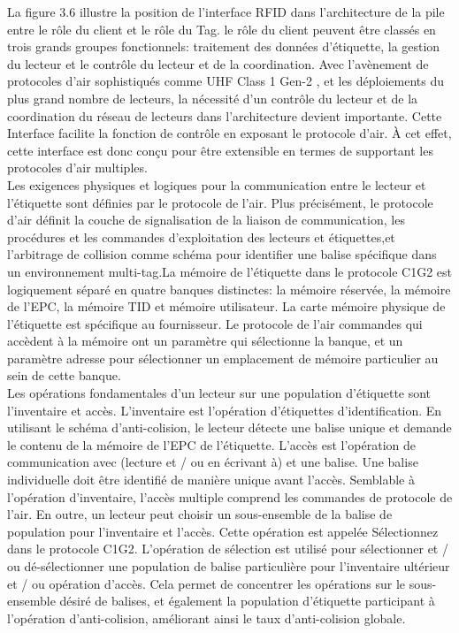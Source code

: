 \documentclass[11pt, a4paper, twoside]{book}
\begin{document}
La figure 3.6 illustre la position de l'interface RFID dans l'architecture de la pile entre le  rôle  du client  et le rôle du Tag. le rôle du client peuvent être classés en trois grands groupes fonctionnels: traitement des données d'étiquette, la gestion du lecteur  et le contrôle du lecteur et de la coordination. Avec l'avènement de protocoles d'air sophistiqués comme UHF Class 1 Gen-2 \cite{air}, et les déploiements du plus grand nombre de lecteurs, la nécessité d'un contrôle du lecteur et de la coordination  du réseau de lecteurs dans l'architecture devient importante. Cette Interface  facilite la fonction de contrôle en exposant le protocole d'air. À cet effet, cette interface est donc conçu pour être extensible en termes de supportant les protocoles d'air multiples.\\

Les exigences physiques et logiques pour la communication entre le lecteur et l'étiquette  sont définies par le protocole de l'air. Plus précisément, le protocole d'air définit la couche de signalisation de la liaison de communication, les procédures et les commandes d'exploitation des lecteurs et étiquettes,et l'arbitrage de collision comme schéma pour identifier une balise spécifique  dans un environnement multi-tag.La mémoire de l'étiquette dans le protocole C1G2 est logiquement  séparé en quatre banques distinctes: la mémoire réservée, la mémoire de l'EPC, la mémoire TID et mémoire utilisateur. La carte mémoire physique de l'étiquette est spécifique au fournisseur. Le protocole de l'air commandes qui accèdent à la mémoire ont un paramètre qui sélectionne la banque, et un paramètre adresse pour sélectionner un emplacement de mémoire particulier au sein de cette banque.\\


Les opérations fondamentales d'un lecteur sur une population d'étiquette sont l'inventaire et accès. L'inventaire est l'opération d'étiquettes d'identification. En utilisant le schéma d'anti-colision, le lecteur détecte une balise unique et demande le contenu de la mémoire de l'EPC de l'étiquette. L'accès est l'opération de  communication avec (lecture et / ou en écrivant à) et une balise. Une balise individuelle doit être identifié de manière unique avant l'accès. Semblable à l'opération d'inventaire, l'accès multiple comprend les commandes de protocole de l'air. En outre, un lecteur peut choisir un sous-ensemble de la balise de population pour l'inventaire et l'accès. Cette opération est appelée Sélectionnez dans le protocole C1G2. L'opération de sélection est utilisé pour sélectionner et / ou dé-sélectionner une population de balise particulière pour l'inventaire ultérieur et / ou opération d'accès. Cela permet de concentrer les opérations sur le sous-ensemble désiré de balises, et également la population d'étiquette participant à l'opération  d'anti-colision, améliorant ainsi le taux d'anti-colision globale.
\end{document}
